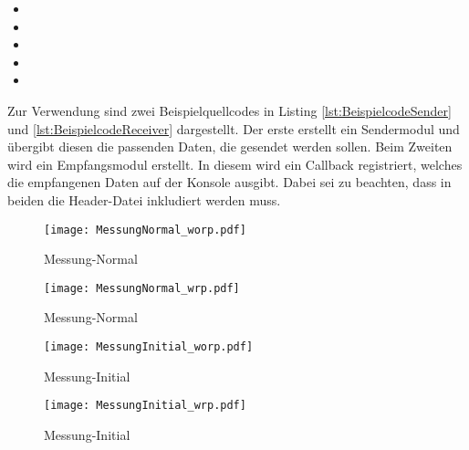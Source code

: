 \begin{itemize}
\item {} 
\item {}
\item {}
\item {}
\item {}
\end{itemize}

Zur Verwendung sind zwei Beispielquellcodes in Listing
\ref{lst:BeispielcodeSender} und \ref{lst:BeispielcodeReceiver} dargestellt. Der
erste erstellt ein Sendermodul und {\"u}bergibt diesen die passenden Daten, die
gesendet werden sollen. Beim Zweiten wird ein Empfangsmodul erstellt. In diesem
wird ein Callback registriert, welches die empfangenen Daten auf der Konsole
ausgibt. Dabei sei zu beachten, dass in beiden die Header-Datei 
inkludiert werden muss.

\newpage

\lstset{language=C++}



\lstset{language=C++}


\newpage
\label{a:messtabellen}

\begin{figure}[H]
	\texttt{[image: MessungNormal\_worp.pdf]}
	\caption{Messung-Normal}	
\end{figure}

\newpage

\begin{figure}[H]
	\texttt{[image: MessungNormal\_wrp.pdf]}
	\caption{Messung-Normal}	
\end{figure}

\newpage

\begin{figure}[H]
	\texttt{[image: MessungInitial\_worp.pdf]}
	\caption{Messung-Initial}	
\end{figure}

\newpage

\begin{figure}[H]
	\texttt{[image: MessungInitial\_wrp.pdf]}
	\caption{Messung-Initial}	
\end{figure}

